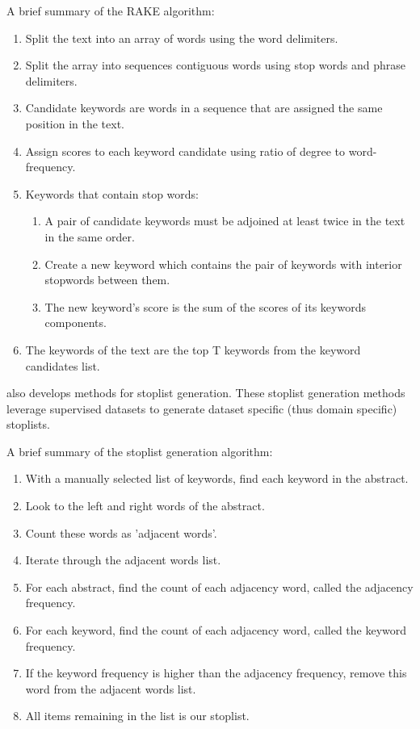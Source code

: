 \documentclass[11pt,a4paper]{article}
\begin{document}
A brief summary of the RAKE algorithm:
\begin{enumerate}
	\item Split the text into an array of words using the word delimiters.
	\item Split the array into sequences contiguous words using stop words and phrase delimiters.
	\item Candidate keywords are words in a sequence that are assigned the same position in the text. 
	\item Assign scores to each keyword candidate using ratio of degree to word-frequency. 
	\item Keywords that contain stop words:
	\begin{enumerate}
		\item A pair of candidate keywords must be adjoined at least twice in the text in the same order.
		\item Create a new keyword which contains the pair of keywords with interior stopwords between them.
		\item The new keyword’s score is the sum of the scores of its keywords components.
	\end{enumerate}
	\item The keywords of the text are the top T keywords from the keyword candidates list.
\end{enumerate}

\citet{1} also develops methods for stoplist generation. These stoplist generation methods leverage supervised datasets to generate dataset specific (thus domain specific) stoplists. 

A brief summary of the stoplist generation algorithm:
\begin{enumerate}
	\item With a manually selected list of keywords, find each keyword in the abstract.
	\item Look to the left and right words of the abstract.
	\item Count these words as 'adjacent words'.
	\item Iterate through the adjacent words list.
	\item For each abstract, find the count of each adjacency word, called the adjacency frequency.
	\item For each keyword, find the count of each adjacency word, called the keyword frequency.
	\item If the keyword frequency is higher than the adjacency frequency, remove this word from the adjacent words list.
	\item All items remaining in the list is our stoplist. 
\end{enumerate}
\end{document}
